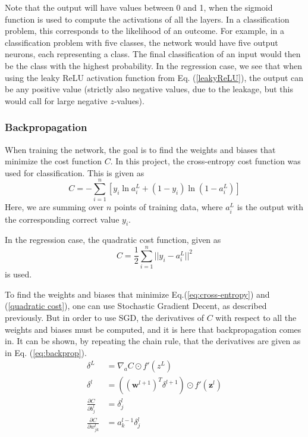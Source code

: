 Note that the output will have values between 0 and 1, when the sigmoid function is used to compute the activations of all the layers. In a classification problem, this corresponds to the likelihood of an outcome. For example, in a classification problem with five classes, the network would have five output neurons, each representing a class. The final classification of an input would then be the class with the highest probability.
In the regression case, we see that when using the leaky ReLU activation function from Eq. (\ref{leakyReLU}), the output can be any positive value (strictly also negative values, due to the leakage, but this would call for large negative $z$-values).

\subsubsection*{Backpropagation}
When training the network, the goal is to find the weights and biases that minimize the cost function $C$. In this project, the cross-entropy cost function was used for classification. This is given as
\begin{equation}\label{eq:cross-entropy}
	C = -\sum_{i=1}^n\left[y_i\ln a^L_i + (1-y_i)\ln(1-a^L_i)\right]
\end{equation}
Here, we are summing over $n$ points of training data, where $a_i^L$ is the output with the corresponding correct value $y_i$.

In the regression case, the quadratic cost function, given as
\begin{equation}\label{quadratic cost}
  C = \frac{1}{2}\sum_{i=1}^n||y_i-a_i^L||^2
\end{equation}
is used.

To find the weights and biases that minimize Eq.(\ref{eq:cross-entropy}) and (\ref{quadratic cost}), one can use Stochastic Gradient Decent, as described previously. But in order to use SGD, the derivatives of $C$ with respect to all the weights and biases must be computed, and it is here that backpropagation comes in. It can be shown, by repeating the chain rule, that the derivatives are given as in Eq. (\ref{eq:backprop}).
\begin{equation}\label{eq:backprop}
\begin{aligned}
	\delta^L &= \nabla_aC\odot f'(z^L)\\
	\delta^l &= ((\boldsymbol{w}^{l+1})^T\delta^{l+1})\odot f'(\boldsymbol{z}^l) \\
	\frac{\partial C}{\partial b^l_j} &= \delta_j^l \\
	\frac{\partial C}{\partial w_{jk}^l} &= a_k^{l-1}\delta^l_j
\end{aligned}
\end{equation}

